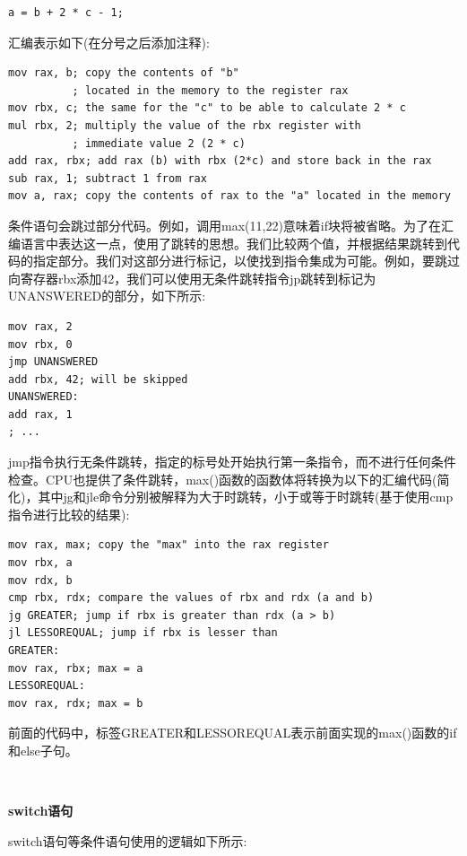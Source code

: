 \begin{lstlisting}[caption={}]
a = b + 2 * c - 1;
\end{lstlisting}

汇编表示如下(在分号之后添加注释): \par

\begin{lstlisting}[caption={}]
mov rax, b; copy the contents of "b"
          ; located in the memory to the register rax
mov rbx, c; the same for the "c" to be able to calculate 2 * c
mul rbx, 2; multiply the value of the rbx register with
          ; immediate value 2 (2 * c)
add rax, rbx; add rax (b) with rbx (2*c) and store back in the rax
sub rax, 1; subtract 1 from rax
mov a, rax; copy the contents of rax to the "a" located in the memory
\end{lstlisting}

条件语句会跳过部分代码。例如，调用max(11,22)意味着if块将被省略。为了在汇编语言中表达这一点，使用了跳转的思想。我们比较两个值，并根据结果跳转到代码的指定部分。我们对这部分进行标记，以使找到指令集成为可能。例如，要跳过向寄存器rbx添加42，我们可以使用无条件跳转指令jp跳转到标记为UNANSWERED的部分，如下所示: \par

\begin{lstlisting}[caption={}]
mov rax, 2
mov rbx, 0
jmp UNANSWERED
add rbx, 42; will be skipped
UNANSWERED:
add rax, 1
; ...
\end{lstlisting}

jmp指令执行无条件跳转，指定的标号处开始执行第一条指令，而不进行任何条件检查。CPU也提供了条件跳转，max()函数的函数体将转换为以下的汇编代码(简化)，其中jg和jle命令分别被解释为大于时跳转，小于或等于时跳转(基于使用cmp指令进行比较的结果):\par

\begin{lstlisting}[caption={}]
mov rax, max; copy the "max" into the rax register
mov rbx, a
mov rdx, b
cmp rbx, rdx; compare the values of rbx and rdx (a and b)
jg GREATER; jump if rbx is greater than rdx (a > b)
jl LESSOREQUAL; jump if rbx is lesser than
GREATER:
mov rax, rbx; max = a
LESSOREQUAL:
mov rax, rdx; max = b
\end{lstlisting}

前面的代码中，标签GREATER和LESSOREQUAL表示前面实现的max()函数的if和else子句。 \par

\noindent\textbf{}\ \par
\textbf{switch语句} \ \par
switch语句等条件语句使用的逻辑如下所示: \par

